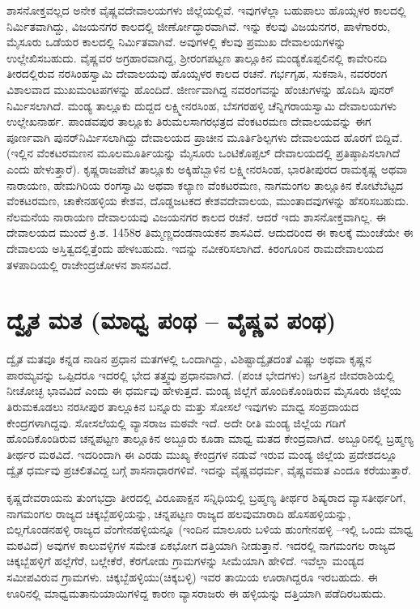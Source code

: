 ಶಾಸನೋಕ್ತವಲ್ಲದ ಅನೇಕ ವೈಷ್ಣವದೇವಾಲಯಗಳು ಜಿಲ್ಲೆಯಲ್ಲಿವೆ. ಇವುಗಳೆಲ್ಲಾ ಬಹುಪಾಲು ಹೊಯ್ಸಳರ ಕಾಲದಲ್ಲಿ ನಿರ್ಮಿತವಾಗಿದ್ದು, ವಿಜಯನಗರ ಕಾಲದಲ್ಲಿ ಜೀರ್ಣೋದ್ಧಾರವಾಗಿವೆ. ಇನ್ನು ಕೆಲವು ವಿಜಯನಗರ, ಪಾಳೆಗಾರರು, ಮೈಸೂರು ಒಡೆಯರ ಕಾಲದಲ್ಲಿ ನಿರ್ಮಿತವಾಗಿವೆ. ಅವುಗಳಲ್ಲಿ ಕೆಲವು ಪ್ರಮುಖ ದೇವಾಲಯಗಳನ್ನು ಉಲ್ಲೇಖಿಸಬಹುದು. ವೈಷ್ಣವರ ಅಗ್ರಹಾರವಾಗಿದ್ದ, ಶ‍್ರೀರಂಗಪಟ್ಟಣ ತಾಲ್ಲೂಕಿನ ಮಂಡ್ಯಕೊಪ್ಪಲಿನಲ್ಲಿ ಕಾವೇರಿನದಿ ತೀರದಲ್ಲಿರುವ ನರಸಿಂಹಸ್ವಾಮಿ ದೇವಾಲಯವು ಹೊಯ್ಸಳರ ಕಾಲದ ರಚನೆ. ಗರ್ಭಗೃಹ, ಸುಕನಾಸಿ, ನವರರಂಗ ವಿಶಾಲವಾದ ಮುಖಮಂಟಪಗಳನ್ನು ಹೊಂದಿದೆ. ಜೀರ್ಣವಾಗಿದ್ದ ನವರಂಗವನ್ನು ಹೆಂಚುಗಳನ್ನು ಹೊದಿಸಿ ಪುನರ್​ನಿರ್ಮಿಸಲಾಗಿದೆ. ಮಂಡ್ಯ ತಾಲ್ಲೂಕು ದುದ್ದದ ಲಕ್ಷ್ಮೀನರಸಿಂಹ, ಬೆಸಗರಹಳ್ಳಿ ಚೆನ್ನಿಗರಾಯಸ್ವಾಮಿ ದೇವಾಲಯಗಳು ಉಲ್ಲೇಖನಾರ್ಹ. ಪಾಂಡವಪುರ ತಾಲ್ಲೂಕು ತಿರುಮಲಸಾಗರಛತ್ರದ ವೆಂಕಟರಮಣ ದೇವಾಲಯವನ್ನು ಈಗ ಪೂರ್ಣವಾಗಿ ಪುನರ್​ನಿರ್ಮಿಸಲಾಗಿದ್ದು ದೇವಾಲಯದ ಪ್ರಾಚೀನ ಮೂರ್ತಿಶಿಲ್ಪಗಳು ದೇವಾಲಯದ ಹೊರಗೆ ಬಿದ್ದಿವೆ. (ಇಲ್ಲಿನ ವೆಂಕಟರಮಣನ ಮೂಲಮೂರ್ತಿಯನ್ನು ಮೈಸೂರು ಒಂಟಿಕೊಪ್ಪಲ್​ ದೇವಾಲಯದಲ್ಲಿ ಪ್ರತಿಷ್ಠಾಪಿಸಲಾಗಿದೆ ಎಂದು ಹೇಳುತ್ತಾರೆ). ಕೃಷ್ಣರಾಜಪೇಟೆ ತಾಲ್ಲೂಕು ಅಕ್ಕಿಹೆಬ್ಬಾಳಿನ ಲಕ್ಷ್ಮೀನರಸಿಂಹ, ಭಾರತೀಪುರದ ರಾಮಕೃಷ್ಣ ಅಥವಾ ನಾರಾಯಣ, ಹೇಮಗಿರಿಯ ರಂಗಸ್ವಾಮಿ ಅಥವಾ ಕಲ್ಯಾಣ ವೆಂಕಟರಮಣ, ನಾಗಮಂಗಲ ತಾಲ್ಲೂಕಿನ ಕೋಟೆಬೆಟ್ಟದ ವೆಂಕಟರಮಣ, ಚಾಕೇನಹಳ್ಳಿಯ ಕೇಶವ, ದೊಡ್ಡಜಟಕದ ಕೇಶವದೇವಾಲಯ, ಮುಂತಾದವುಗಳನ್ನು ಹೆಸರಿಸಬಹುದು. ನೆಲಮನೆಯ ನಾರಾಯಣ ದೇವಾಲಯವು ವಿಜಯನಗರ ಕಾಲದ ರಚನೆ. ಆದರೆ ಇದು ಶಾಸನೋಕ್ತವಾಗಿಲ್ಲ. ಈ ದೇವಾಲಯದ ಮುಂದೆ ಕ್ರಿ.ಶ. 1458ರ ತಿಮ್ಮಣ್ಣದಂಡನಾಯಕನ ಶಾಸವಿದೆ. ಆದುದರಿಂದ ಈ ಕಾಲಕ್ಕೆ ಮುಂಚೆಯೇ ಈ ದೇವಾಲಯ ಅಸ್ತಿತ್ವದಲ್ಲಿತ್ತೆಂದು ಹೇಳಬಹುದು. ಇದನ್ನು ನವೀಕರಿಸಲಾಗಿದೆ. ಕಿರಂಗೂರಿನ ರಾಮದೇವಾಲಯದ ತಳಪಾದಿಯಲ್ಲಿ ರಾಜೇಂದ್ರಚೋಳನ ಶಾಸನವಿದೆ.


\section{ದ್ವೈತ ಮತ (ಮಾಧ್ವ ಪಂಥ – ವೈಷ್ಣವ ಪಂಥ)}

ದ್ವೈತ ಮತವೂ ಕನ್ನಡ ನಾಡಿನ ಪ್ರಧಾನ ಮತಗಳಲ್ಲಿ ಒಂದಾಗಿದ್ದು, ವಿಶಿಷ್ಟಾದ್ವೈತದಂತೆ ವಿಷ್ಣು ಅಥವಾ ಕೃಷ್ಣನ ಪಾರಮ್ಯವನ್ನು ಒಪ್ಪಿದರೂ ಇದರಲ್ಲಿ ಭೇದ ತತ್ತ್ವವು ಪ್ರಧಾನವಾಗಿದೆ. (ಪಂಚ ಭೇದಗಳು) ಜಗತ್ತಿನ ಜೀವರಾಶಿಯಲ್ಲಿ ನೀಚೋಚ್ಛ ಭಾವವಿದೆ ಎಂದು ಈ ಧರ್ಮವು ಹೇಳುತ್ತದೆ. ಮಂಡ್ಯ ಜಿಲ್ಲೆಗೆ ಹೊಂದಿಕೊಂಡಿರುವ ಮೈಸೂರು ಜಿಲ್ಲೆಯ ತಿರುಮಕೂಡಲು ನರಸೀಪುರ ತಾಲ್ಲೂಕಿನ ಬನ್ನೂರು ಮತ್ತು ಸೋಸಲೆ ಇವುಗಳು ಮಾಧ್ವ ಸಂಪ್ರದಾಯದ ಕೇಂದ್ರಗಳಾಗಿದ್ದವು. ಸೋಸಲೆಯಲ್ಲಿ ವ್ಯಾಸರಾಜ ಮಠವೇ ಇದೆ. ಅದೇ ರೀತಿ ಮಂಡ್ಯ ಜಿಲ್ಲೆಯ ಗಡಿಗೆ ಹೊಂದಿಕೊಂಡಿರುವ ಚನ್ನಪಟ್ಟಣ ತಾಲ್ಲೂಕಿನ ಅಬ್ಬೂರು ಕೂಡಾ ಮಾಧ್ವ ಮತದ ಕೇಂದ್ರವಾಗಿದೆ. ಅಬ್ಬೂರಿನಲ್ಲಿ ಬ್ರಹ್ಮಣ್ಯ ತೀರ್ಥರ ಮಠವಿದೆ. ಇದರಿಂದಾಗಿ ಈ ಎರಡು ಮುಖ್ಯ ಕೇಂದ್ರಗಳ ನಡುವೆ ಇರುವ ಮಂಡ್ಯ ಜಿಲ್ಲೆಯ ಪ್ರದೇಶದಲ್ಲೂ ದ್ವೈತ ಧರ್ಮವು ಪ್ರಚಲಿತವಿದ್ದ ಬಗ್ಗೆ ಶಾಸನಾಧಾರಗಳಿವೆ. ಇದನ್ನು ವೈಷ್ಣವಧರ್ಮ, ವೈಷ್ಣವಮತ ಎಂದೂ ಕರೆಯುತ್ತಾರೆ.

ಕೃಷ್ಣದೇವರಾಯನು ತುಂಗಭದ್ರಾ ತೀರದಲ್ಲಿ ವಿರೂಪಾಕ್ಷನ ಸನ್ನಿಧಿಯಲ್ಲಿ ಬ್ರಹ್ಮಣ್ಯ ತೀರ್ಥರ ಶಿಷ್ಯರಾದ ವ್ಯಾಸತೀರ್ಥರಿಗೆ, ನಾಗಮಂಗಲ ರಾಜ್ಯದ ಚಿಕ್ಕಬ್ಬೆಹಳ್ಳಿಯನ್ನು, ಚನ್ನಪಟ್ಟಣ ರಾಜ್ಯದ ಹಲವುಮಾರಾದಿ ಹೊಸಹಳ್ಳಿಯನ್ನು, ಬಿಲ್ಲಗೊಂಡನಹಳ್ಳಿ ರಾಜ್ಯದ ವೆಂಗೇನಹಳ್ಳಿಯನ್ನೂ (ಇಂದಿನ ಮಾಲೂರು ಬಳಿಯ ಹುಂಗೇನಹಳ್ಳಿ –ಇಲ್ಲಿ ಒಂದು ಮಾಧ್ವ ಮಠವಿದೆ) ಅವುಗಳ ಕಾಲುವಳ್ಳಿಗಳ ಸಮೇತ ಏಕಭೋಗ ದತ್ತಿಯಾಗಿ ನೀಡುತ್ತಾನೆ. ಇದರಲ್ಲಿ ನಾಗಮಂಗಲ ರಾಜ್ಯದ ಚಿಕ್ಕಬ್ಬೆಹಳ್ಳಿಗೆ ಹಲ್ಲೆಗೆರೆ, ಬಲ್ಲೇಕೆರೆ, ಕೆರಗೋಡು ಗ್ರಾಮಗಳನ್ನು ಸೀಮೆಯಾಗಿ ಹೇಳಿದೆ. ಇವೆಲ್ಲಾ ಮಂಡ್ಯದ ಸಮೀಪವಿರುವ ಗ್ರಾಮಗಳು. ಚಿಕ್ಕಬ್ಬೆಹಳ್ಳಿಯು(ಚಿಕ್ಕಬಳ್ಳಿ) ಇವರ ತಾಯಿಯ ಊರಾಗಿದ್ದರೂ ಇರಬಹುದು. ಈ ಊರಿನಲ್ಲಿ ಮಾಧ್ವಮತಾನುಯಾಯಿಗಳಿದ್ದ ಕಾರಣ ವ್ಯಾಸರಾಜರು ಈ ಹಳ್ಳಿಯನ್ನು ದತ್ತಿಯಾಗಿ ಪಡೆದಿರಬಹುದು.

